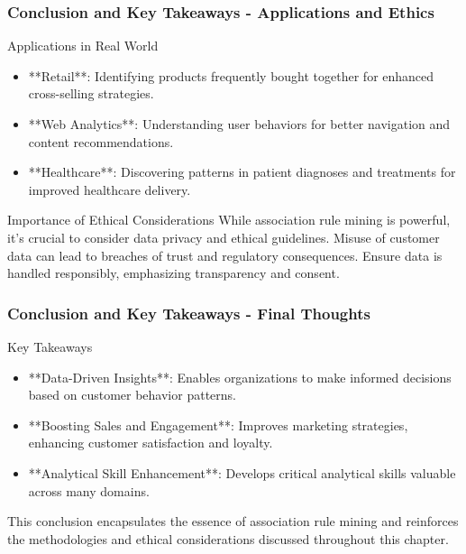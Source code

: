 \documentclass[aspectratio=169]{beamer}
\begin{document}
\begin{frame}[fragile]
  \frametitle{Conclusion and Key Takeaways - Applications and Ethics}
  \begin{block}{Applications in Real World}
    \begin{itemize}
      \item **Retail**: Identifying products frequently bought together for enhanced cross-selling strategies.
      \item **Web Analytics**: Understanding user behaviors for better navigation and content recommendations.
      \item **Healthcare**: Discovering patterns in patient diagnoses and treatments for improved healthcare delivery.
    \end{itemize}
  \end{block}
  
  \begin{block}{Importance of Ethical Considerations}
    While association rule mining is powerful, it’s crucial to consider data privacy and ethical guidelines. Misuse of customer data can lead to breaches of trust and regulatory consequences. Ensure data is handled responsibly, emphasizing transparency and consent.
  \end{block}
\end{frame}

\begin{frame}[fragile]
  \frametitle{Conclusion and Key Takeaways - Final Thoughts}
  \begin{block}{Key Takeaways}
    \begin{itemize}
      \item **Data-Driven Insights**: Enables organizations to make informed decisions based on customer behavior patterns.
      \item **Boosting Sales and Engagement**: Improves marketing strategies, enhancing customer satisfaction and loyalty.
      \item **Analytical Skill Enhancement**: Develops critical analytical skills valuable across many domains.
    \end{itemize}
  \end{block}
  
  This conclusion encapsulates the essence of association rule mining and reinforces the methodologies and ethical considerations discussed throughout this chapter.
\end{frame}
\end{document}
